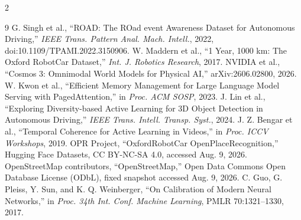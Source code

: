 \documentclass[9pt,a4paper]{extarticle}
\begin{document}
\begin{multicols}{2}
{\footnotesize
\raggedright
\begin{thebibliography}{9}
G. Singh et al., ``ROAD: The ROad event Awareness Dataset for Autonomous Driving,''
\textit{IEEE Trans. Pattern Anal. Mach. Intell.}, 2022,
doi:10.1109/TPAMI.2022.3150906.
W. Maddern et al., ``1 Year, 1000 km: The Oxford RobotCar Dataset,''
\textit{Int. J. Robotics Research}, 2017.
NVIDIA et al., ``Cosmos 3: Omnimodal World Models for Physical AI,''
arXiv:2606.02800, 2026.
W. Kwon et al., ``Efficient Memory Management for Large Language Model Serving
with PagedAttention,'' in \textit{Proc. ACM SOSP}, 2023.
J. Lin et al., ``Exploring Diversity-based Active Learning for 3D Object Detection
in Autonomous Driving,'' \textit{IEEE Trans. Intell. Transp. Syst.}, 2024.
J. Z. Bengar et al., ``Temporal Coherence for Active Learning in Videos,''
in \textit{Proc. ICCV Workshops}, 2019.
OPR Project, ``OxfordRobotCar OpenPlaceRecognition,'' Hugging Face Datasets,
CC BY-NC-SA 4.0, accessed Aug. 9, 2026.
OpenStreetMap contributors, ``OpenStreetMap,'' Open Data Commons Open
Database License (ODbL), fixed snapshot accessed Aug. 9, 2026.
C. Guo, G. Pleiss, Y. Sun, and K. Q. Weinberger,
``On Calibration of Modern Neural Networks,''
in \textit{Proc. 34th Int. Conf. Machine Learning}, PMLR 70:1321--1330, 2017.
\end{thebibliography}
}
\end{multicols}
\end{document}
